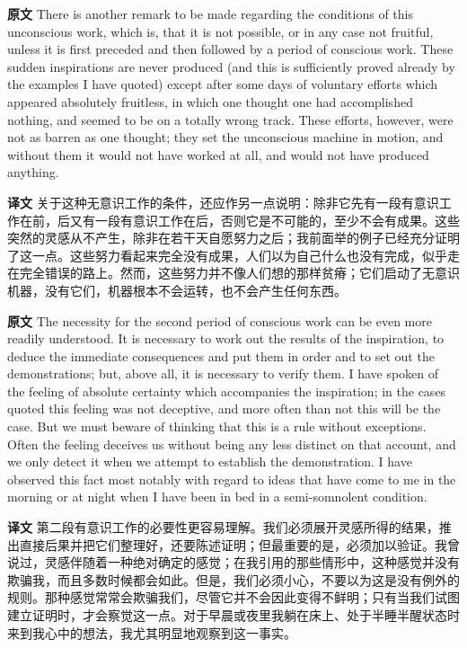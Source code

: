 \documentclass[UTF8]{ctexart}
\newenvironment{english}{\par\small\noindent\textbf{原文}\quad\ignorespaces}{\par}
\newenvironment{zhtranslation}{\par\noindent\textbf{译文}\quad\ignorespaces}{\par\vspace{0.35em}}
\begin{document}
\begin{english}
There is another remark to be made regarding the conditions of this unconscious work, which is, that it is not possible, or in any case not fruitful, unless it is first preceded and then followed by a period of conscious work. These sudden inspirations are never produced (and this is sufficiently proved already by the examples I have quoted) except after some days of voluntary efforts which appeared absolutely fruitless, in which one thought one had accomplished nothing, and seemed to be on a totally wrong track. These efforts, however, were not as barren as one thought; they set the unconscious machine in motion, and without them it would not have worked at all, and would not have produced anything.
\end{english}
\begin{zhtranslation}
关于这种无意识工作的条件，还应作另一点说明：除非它先有一段有意识工作在前，后又有一段有意识工作在后，否则它是不可能的，至少不会有成果。这些突然的灵感从不产生，除非在若干天自愿努力之后；我前面举的例子已经充分证明了这一点。这些努力看起来完全没有成果，人们以为自己什么也没有完成，似乎走在完全错误的路上。然而，这些努力并不像人们想的那样贫瘠；它们启动了无意识机器，没有它们，机器根本不会运转，也不会产生任何东西。\end{zhtranslation}

\begin{english}
The necessity for the second period of conscious work can be even more readily understood. It is necessary to work out the results of the inspiration, to deduce the immediate consequences and put them in order and to set out the demonstrations; but, above all, it is necessary to verify them. I have spoken of the feeling of absolute certainty which accompanies the inspiration; in the cases quoted this feeling was not deceptive, and more often than not this will be the case. But we must beware of thinking that this is a rule without exceptions. Often the feeling deceives us without being any less distinct on that account, and we only detect it when we attempt to establish the demonstration. I have observed this fact most notably with regard to ideas that have come to me in the morning or at night when I have been in bed in a semi-somnolent condition.
\end{english}
\begin{zhtranslation}
第二段有意识工作的必要性更容易理解。我们必须展开灵感所得的结果，推出直接后果并把它们整理好，还要陈述证明；但最重要的是，必须加以验证。我曾说过，灵感伴随着一种绝对确定的感觉；在我引用的那些情形中，这种感觉并没有欺骗我，而且多数时候都会如此。但是，我们必须小心，不要以为这是没有例外的规则。那种感觉常常会欺骗我们，尽管它并不会因此变得不鲜明；只有当我们试图建立证明时，才会察觉这一点。对于早晨或夜里我躺在床上、处于半睡半醒状态时来到我心中的想法，我尤其明显地观察到这一事实。\end{zhtranslation}
\end{document}
